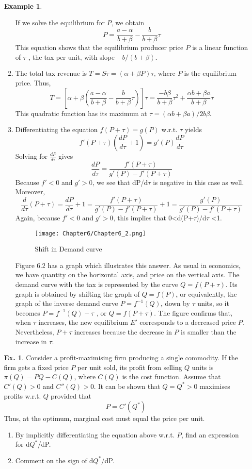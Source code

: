 \documentclass[10pt,a4paper]{book}
\theoremstyle{definition}\newtheorem{definition}{Definition}
\theoremstyle{definition}\newtheorem{fact}{Fact}
\theoremstyle{definition}\newtheorem{ex}{Ex.}
\theoremstyle{definition}\newtheorem{project}{Project}
\theoremstyle{definition}\newtheorem{problem}{Problem}
\theoremstyle{definition}\newtheorem{example}{Example}
\numberwithin{theorem}{chapter}
\numberwithin{corollary}{chapter}
\numberwithin{assumption}{chapter}
\numberwithin{definition}{chapter}
\numberwithin{prop}{chapter}
\numberwithin{notation}{chapter}
\numberwithin{problem}{chapter}
\numberwithin{example}{chapter}
\numberwithin{fact}{chapter}
\numberwithin{ex}{chapter}
\begin{document}
\begin{example}
\begin{enumerate}[label=(\alph*)]
			If we solve the equilibrium for $P$, we obtain
			$$P = \frac{a-\alpha}{b+\beta} - \frac{b}{b+\beta}\tau$$
			This equation shows that the equilibrium producer price $P$ is a linear function of $\tau$ , the tax per unit, with slope $-b/(b + \beta)$.
			\item The total tax revenue is $T = S\tau = (\alpha + \beta P)\tau$, where $P$ is the equilibrium price. Thus,
			$$T=\left[ \alpha + \beta \left(\frac{a-\alpha}{b+\beta} - \frac{b}{b+\beta}\tau \right) \right] \tau = \frac{-b\beta}{b+\beta}\tau^2+\frac{\alpha b+\beta a}{b+\beta}\tau$$
			This quadratic function has its maximum at $\tau = (\alpha b + \beta a)/2b\beta$.
			\item Differentiating the equation $f (P + \tau ) = g(P)$ w.r.t. $\tau$ yields
			$$f'(P+\tau)\left(\frac{dP}{d\tau}+1 \right)=g'(P)\frac{dP}{d\tau}$$
			Solving for $\frac{dP}{d\tau}$ gives
			$$\frac{dP}{d\tau}=\frac{f'(P+\tau)}{g'(P)-f'(P+\tau)}$$
			Because $f'< 0$ and $g'> 0$, we see that dP/d$\tau$ is negative in this case as well. Moreover,
			$$\frac{d}{d\tau}(P+\tau) = \frac{dP}{d\tau}+1=\frac{f'(P+\tau)}{g'(P)-f'(P+\tau)}+1=\frac{g'(P)}{g'(P)-f'(P+\tau)}$$
			Again, because $f'<0$ and $g'>0$, this implies that 0<d(P+$\tau$)/d$\tau$ <1.
			\begin{figure}[H]
				\centering
				\texttt{[image: Chapter6/Chapter6\_2.png]}
				\caption{Shift in Demand curve}
			\end{figure}
			Figure 6.2 has a graph which illustrates this answer. As usual in economics, we have quantity on the horizontal axis, and price on the vertical axis. The demand curve with the tax is represented by the curve $Q = f (P + \tau )$. Its graph is obtained by shifting the graph of $Q = f (P)$, or equivalently, the graph of the inverse demand curve $P = f^{-1} (Q)$, down by $\tau$ units, so it becomes $P = f^{-1} (Q) - \tau$ , or $Q = f (P + \tau )$. The figure confirms that, when $\tau$ increases, the new equilibrium $E'$ corresponds to a decreased price $P$. Nevertheless, $P + \tau$ increases because the decrease in $P$ is smaller than the increase in $\tau$.
		\end{enumerate}
	\end{example}
	
	\begin{ex}
		Consider a profit-maximising firm producing a single commodity. If the firm gets a fixed price $P$ per unit sold, its profit from selling $Q$ units is $\pi(Q) = PQ - C(Q)$, where $C(Q)$ is the cost function. Assume that $C'(Q) > 0$ and $C''(Q) > 0$. It can be shown that $Q = Q^* > 0$ maximises profits w.r.t. $Q$ provided that
		$$P=C'(Q^*)$$
		Thus, at the optimum, marginal cost must equal the price per unit.
		\begin{enumerate}[label=(\alph*)]
			\item By implicitly differentiating the equation above w.r.t. $P$, find an expression for d$Q^*$/dP.
			\item Comment on the sign of d$Q^*$/dP.
		\end{enumerate}
	\end{ex}
	
\end{document}
